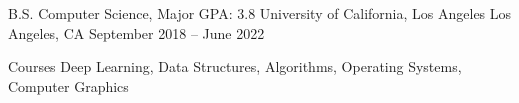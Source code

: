 \documentclass[12pt, letterpaper]{awesome-cv}
\begin{document}
\makecvheader


\begin{cventries}
  \cventry
    {B.S. Computer Science, Major GPA: 3.8} %
    {University of California, Los Angeles} %
    {Los Angeles, CA} %
    {September 2018 -- June 2022} %
    {
      \vspace{-0.11in}
      \begin{cvskills}
        \cvskill
          {Courses} %
          {Deep Learning, Data Structures, Algorithms, Operating Systems, Computer Graphics} %
      \end{cvskills}
    }
  \vspace{-0.2in}
\end{cventries}
\end{document}
